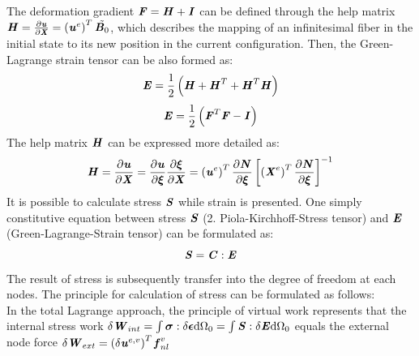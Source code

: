 The deformation gradient $\textbf{\textit{F}} = \textbf{\textit{H}} + \textbf{\textit{I}}$ can be defined through the help matrix $\textbf{\textit{H}} = \frac{\partial \textbf{\textit{u}}}{\partial \textbf{\textit{X}}} = \left(\textbf{\textit{u}}^e\right)^T \tilde{\textbf{\textit{B}}_0}$, which describes the mapping of an infinitesimal fiber in the initial state to its new position in the current configuration. Then, the Green-Lagrange strain tensor can be also formed as:
\begin{equation}
\textbf{\textit{E}} = \frac{1}{2} \left(\textbf{\textit{H}} + \textbf{\textit{H}}^T + \textbf{\textit{H}}^T \textbf{\textit{H}}\right)
\end{equation}
\begin{equation} \label{eq: E_eq}
\textbf{\textit{E}} = \frac{1}{2} \left(\textbf{\textit{F}}^T \textbf{\textit{F}} - \textbf{\textit{I}}\right)
\end{equation}
The help matrix $\textbf{\textit{H}}$ can be expressed more detailed as:
\begin{equation} \label{eq: Help_matrix}
\textbf{\textit{H}} = \frac{\partial \textbf{\textit{u}}}{\partial \textbf{\textit{X}}} = \frac{\partial \textbf{\textit{u}}}{\partial \boldsymbol{\xi}} \frac{\partial \boldsymbol{\xi}}{\partial \textbf{\textit{X}}} = \left(\textbf{\textit{u}}^e\right)^T \frac{\partial \textbf{\textit{N}}}{\partial \boldsymbol{\xi}} \left[ \left(\textbf{\textit{X}}^e\right)^T \frac{\partial \textbf{\textit{N}}}{\partial \boldsymbol{\xi}}\right]^{-1}
\end{equation}
It is possible to calculate stress $\textbf{\textit{S}}$ while strain is presented. One simply constitutive equation between stress $\textbf{\textit{S}}$ (2. Piola-Kirchhoff-Stress tensor) and $\textbf{\textit{E}}$ (Green-Lagrange-Strain tensor) can be formulated as:
\begin{equation}
\textbf{\textit{S}} = \textbf{\textit{C}} : \textbf{\textit{E}}
\end{equation}
The result of stress is subsequently transfer into the degree of freedom at each nodes. The principle for calculation of stress can be formulated as follows:\\
In the total Lagrange approach, the principle of virtual work represents that the internal stress work $\delta \textbf{\textit{W}}_{int} = \int \boldsymbol{\sigma} : \delta \boldsymbol{\epsilon} \mathrm{d}\Omega_0 = \int \textbf{\textit{S}} : \delta \textbf{\textit{E}} \mathrm{d}\Omega_0$ equals the external node force $\delta \textbf{\textit{W}}_{ext} = \left(\delta \textbf{\textit{u}}^{e,v}\right)^T \textbf{\textit{f}}_{nl}^v$
